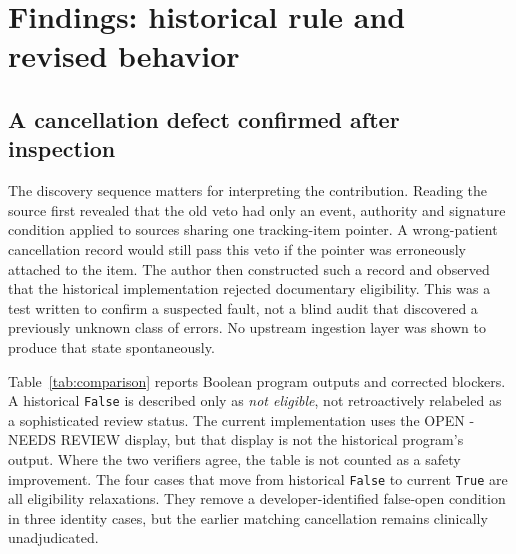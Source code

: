 \documentclass[11pt,twocolumn]{article}
\newcommand{\code}[1]{\texttt{#1}}
\newcommand{\stage}[1]{\textsf{#1}}
\begin{document}
\section{Findings: historical rule and revised behavior}\label{sec:findings}
\subsection{A cancellation defect confirmed after inspection}
The discovery sequence matters for interpreting the contribution. Reading the source first revealed that the old veto had only an event, authority and signature condition applied to sources sharing one tracking-item pointer. A wrong-patient cancellation record would still pass this veto if the pointer was erroneously attached to the item. The author then constructed such a record and observed that the historical implementation rejected documentary eligibility. This was a test written to confirm a suspected fault, not a blind audit that discovered a previously unknown class of errors. No upstream ingestion layer was shown to produce that state spontaneously.

Table~\ref{tab:comparison} reports Boolean program outputs and corrected blockers. A historical \code{False} is described only as \emph{not eligible}, not retroactively relabeled as a sophisticated review status. The current implementation uses the \stage{OPEN - NEEDS REVIEW} display, but that display is not the historical program's output. Where the two verifiers agree, the table is not counted as a safety improvement. The four cases that move from historical \code{False} to current \code{True} are all eligibility relaxations. They remove a developer-identified false-open condition in three identity cases, but the earlier matching cancellation remains clinically unadjudicated.
\end{document}
